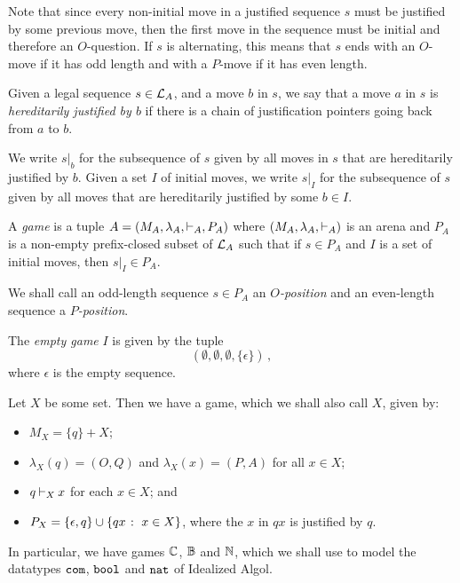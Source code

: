 Note that since every non-initial move in a justified sequence $s$ must be justified by some previous move, then the first move in the sequence must be initial and therefore an $O$-question.  
If $s$ is alternating, this means that $s$ ends with an $O$-move if it has odd length and with a $P$-move if it has even length.  

\begin{definition}
  Given a legal sequence $s\in \mathcal L_A$, and a move $b$ in $s$, we say that a move $a$ in $s$ is \emph{hereditarily justified by $b$} if there is a chain of justification pointers going back from $a$ to $b$.

  We write $s\vert_b$ for the subsequence of $s$ given by all moves in $s$ that are hereditarily justified by $b$.
  Given a set $I$ of initial moves, we write $s\vert_I$ for the subsequence of $s$ given by all moves that are hereditarily justified by some $b\in I$.

  A \emph{game} is a tuple $A=(M_A,\lambda_A,\mathbin{\vdash}_A,P_A)$ where $(M_A,\lambda_A,\mathbin{\vdash}_A)$ is an arena and $P_A$ is a non-empty prefix-closed subset of $\mathcal L_A$ such that if $s\in P_A$ and $I$ is a set of initial moves, then $s\vert_I\in P_A$.
\end{definition}

We shall call an odd-length sequence $s\in P_A$ an \emph{$O$-position} and an even-length sequence a \emph{$P$-position}.

\begin{example}
  The \emph{empty game} $I$ is given by the tuple
  \[
    (\emptyset,\emptyset,\emptyset,\{\epsilon\})\,,
    \]
  where $\epsilon$ is the empty sequence.
  \label{ExEmptyGame}
\end{example}

\begin{example}
  Let $X$ be some set.  
  Then we have a game, which we shall also call $X$, given by:
  \begin{itemize}
    \item $M_X = \{q\} + X$;
    \item $\lambda_X(q)=(O,Q)$ and $\lambda_X(x)=(P,A)$ for all $x\in X$;
    \item $q\mathbin{\vdash}_X x$ for each $x\in X$; and
    \item $P_X = \{\epsilon,q\}\cup\{qx\;\colon\; x\in X\}$, where the $x$ in $qx$ is justified by $q$.
  \end{itemize}

  In particular, we have games $\mathbb{C}$, $\mathbb{B}$ and $\mathbb{N}$, which we shall use to model the datatypes ${\mathtt{com}}$, ${\mathtt{bool}}$ and ${\mathtt{nat}}$ of Idealized Algol.
\end{example}

